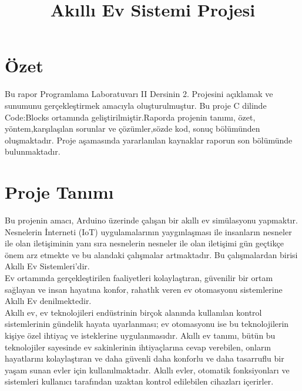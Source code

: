 \documentclass[conference]{IEEEtran}
\begin{document}
\title{Akıllı Ev Sistemi Projesi\\
}

\author{
\and
{}
}

\maketitle

\section{Özet}
Bu rapor Programlama Laboratuvarı II Dersinin 2. Projesini açıklamak ve sunumunu gerçekleştirmek amacıyla oluşturulmuştur. Bu proje C dilinde Code:Blocks ortamında geliştirilmiştir.Raporda projenin tanımı, özet, yöntem,karşılaşılan sorunlar ve çözümler,sözde kod, sonuç bölümünden oluşmaktadır. Proje aşamasında yararlanılan kaynaklar raporun son bölümünde bulunmaktadır. 


\section{Proje Tanımı}
 Bu projenin amacı, Arduino üzerinde çalışan bir akıllı ev simülasyonu yapmaktır.\\

Nesnelerin İnterneti (IoT) uygulamalarının yaygınlaşması ile insanların nesneler ile olan 
iletişiminin yanı sıra nesnelerin nesneler ile olan iletişimi gün geçtikçe önem arz etmekte ve bu alandaki çalışmalar artmaktadır. Bu çalışmalardan birisi Akıllı Ev Sistemleri’dir.\\
Ev ortamında gerçekleştirilen faaliyetleri kolaylaştıran, güvenilir bir ortam sağlayan ve insan 
hayatına konfor, rahatlık veren ev otomasyonu sistemlerine Akıllı Ev denilmektedir.\\
Akıllı ev, ev teknolojileri endüstrinin birçok alanında kullanılan kontrol sistemlerinin gündelik 
hayata uyarlanması; ev otomasyonu ise bu teknolojilerin kişiye özel ihtiyaç ve isteklerine 
uygulanmasıdır. Akıllı ev tanımı, bütün bu teknolojiler sayesinde ev sakinlerinin ihtiyaçlarına 
cevap verebilen, onların hayatlarını kolaylaştıran ve daha güvenli daha konforlu ve daha 
tasarruflu bir yaşam sunan evler için kullanılmaktadır. Akıllı evler, otomatik fonksiyonları ve 
sistemleri kullanıcı tarafından uzaktan kontrol edilebilen cihazları içerirler.\\
\end{document}
